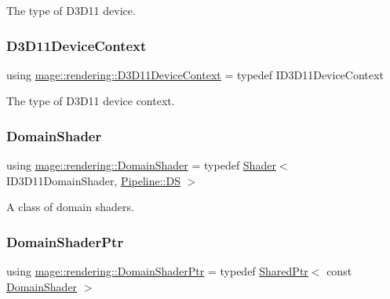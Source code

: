 The type of D3\+D11 device. \mbox{\label{namespacemage_1_1rendering_a4b23dd00d80ca4f6856375936261a13d}} 
\subsubsection{\texorpdfstring{D3\+D11\+Device\+Context}{D3D11DeviceContext}}
{\footnotesize\ttfamily using \mbox{\hyperlink{namespacemage_1_1rendering_a4b23dd00d80ca4f6856375936261a13d}{mage\+::rendering\+::\+D3\+D11\+Device\+Context}} = typedef I\+D3\+D11\+Device\+Context}

The type of D3\+D11 device context. \mbox{\label{namespacemage_1_1rendering_a02bd57ea68f48dd6e0d37a1362ad1ea2}} 
\subsubsection{\texorpdfstring{Domain\+Shader}{DomainShader}}
{\footnotesize\ttfamily using \mbox{\hyperlink{namespacemage_1_1rendering_a02bd57ea68f48dd6e0d37a1362ad1ea2}{mage\+::rendering\+::\+Domain\+Shader}} = typedef \mbox{\hyperlink{classmage_1_1rendering_1_1_shader}{Shader}}$<$ I\+D3\+D11\+Domain\+Shader, \mbox{\hyperlink{structmage_1_1rendering_1_1_pipeline_1_1_d_s}{Pipeline\+::\+DS}} $>$}

A class of domain shaders. \mbox{\label{namespacemage_1_1rendering_a85a8911c7c1e9e42bd7c3acbc2725076}} 
\subsubsection{\texorpdfstring{Domain\+Shader\+Ptr}{DomainShaderPtr}}
{\footnotesize\ttfamily using \mbox{\hyperlink{namespacemage_1_1rendering_a85a8911c7c1e9e42bd7c3acbc2725076}{mage\+::rendering\+::\+Domain\+Shader\+Ptr}} = typedef \mbox{\hyperlink{namespacemage_a1e01ae66713838a7a67d30e44c67703e}{Shared\+Ptr}}$<$ const \mbox{\hyperlink{namespacemage_1_1rendering_a02bd57ea68f48dd6e0d37a1362ad1ea2}{Domain\+Shader}} $>$}

